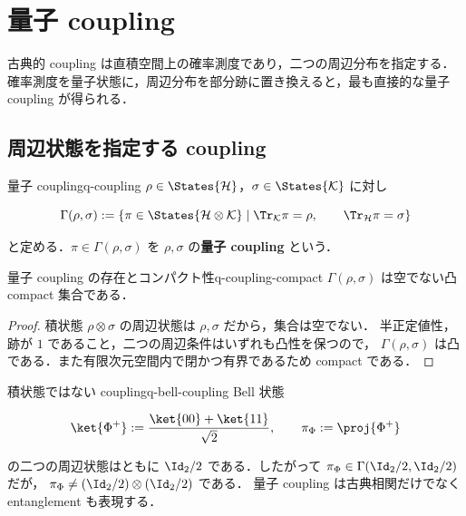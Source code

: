 \chapter{量子 coupling}
\label{ch:quantum-couplings}

古典的 coupling は直積空間上の確率測度であり，二つの周辺分布を指定する．
確率測度を量子状態に，周辺分布を部分跡に置き換えると，最も直接的な量子 coupling が得られる．

\section{周辺状態を指定する coupling}

\begin{definition}{量子 coupling}{q-coupling}
  $\rho\in\States{\mathcal{H}}$，$\sigma\in\States{\mathcal{K}}$ に対し

  \[
    \Gamma(\rho,\sigma)
    :=
    \left\{
      \pi\in\States{\mathcal{H}\otimes\mathcal{K}}
      \;\middle|\;
      \Tr_{\mathcal{K}}\pi=\rho,\qquad
      \Tr_{\mathcal{H}}\pi=\sigma
    \right\}
  \]

  と定める．$\pi\in\Gamma(\rho,\sigma)$ を $\rho,\sigma$ の\textbf{量子 coupling} という．
\end{definition}

\begin{proposition}{量子 coupling の存在とコンパクト性}{q-coupling-compact}
  $\Gamma(\rho,\sigma)$ は空でない凸 compact 集合である．
\end{proposition}

\begin{proof}
  積状態 $\rho\otimes\sigma$ の周辺状態は $\rho,\sigma$ だから，集合は空でない．
  半正定値性，跡が $1$ であること，二つの周辺条件はいずれも凸性を保つので，
  $\Gamma(\rho,\sigma)$ は凸である．また有限次元空間内で閉かつ有界であるため compact である．
\end{proof}

\begin{example}{積状態ではない coupling}{q-bell-coupling}
  Bell 状態

  \[
    \ket{\Phi^+}:=\frac{\ket{00}+\ket{11}}{\sqrt2},
    \qquad
    \pi_{\Phi}:=\proj{\Phi^+}
  \]

  の二つの周辺状態はともに $\Id_2/2$ である．したがって
  $\pi_\Phi\in\Gamma(\Id_2/2,\Id_2/2)$ だが，
  $\pi_\Phi\neq(\Id_2/2)\otimes(\Id_2/2)$ である．
  量子 coupling は古典相関だけでなく entanglement も表現する．
\end{example}

